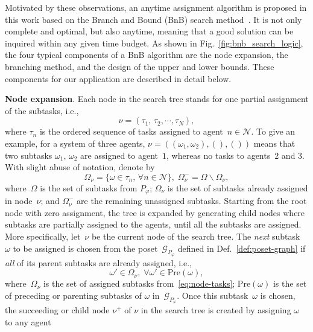 Motivated by these observations, an anytime assignment
algorithm is proposed in this work based on the Branch and Bound (BnB) search
method~\cite{lawler1966branch, morrison2016branch}.
It is not only complete and optimal, but also anytime, meaning that a good
solution can be inquired within any given time budget.
As shown in Fig.~\ref{fig:bnb_search_logic},
the four typical components of a BnB
algorithm are the node expansion, the branching method,
and the design of the upper and lower bounds.
These components for our application are described in detail below.

\textbf{Node expansion}.
Each node in the search tree stands for one partial assignment of the
subtasks, i.e.,
\begin{equation}\label{eq:node}
\nu = (\tau_1,\,\tau_2,\cdots,\tau_N),
\end{equation}
where $\tau_n$ is the ordered sequence of tasks assigned to agent~$n\in \mathcal{N}$.
To give an example, for a system of three agents,
$\nu=((\omega_1,\omega_2),(),())$ means that two subtasks
$\omega_1,\, \omega_2$ are assigned to agent~$1$,
whereas no tasks to agents~$2$ and $3$.
With slight abuse of notation, denote by
\begin{equation}\label{eq:node-tasks}
\Omega_{\nu}=\{\omega\in\tau_n,\,\forall n\in \mathcal{N}\},
\;\Omega^-_{\nu} = \Omega\backslash \Omega_{\nu},
\end{equation}
where~$\Omega$ is the set of subtasks from $P_\varphi$;
$\Omega_{\nu}$ is the set of subtasks already assigned in node~$\nu$;
and $\Omega^-_{\nu}$ are the remaining unassigned subtasks.
Starting from the root node with zero assignment, the tree is expanded by
generating child nodes where subtasks are partially assigned to the agents,
until all the subtasks are assigned.
More specifically,
let~$\nu$ be the current node of the search tree.
The \emph{next} subtask~$\omega$ to be assigned is chosen from the
poset~$\mathcal{G}_{P_\varphi}$ defined in Def.~\ref{def:poset-graph}
if \emph{all} of its parent subtasks are already assigned, i.e.,
\begin{equation}\label{eq:next-task}
\omega' \in \Omega_\nu, \; \forall \omega' \in \text{Pre}(\omega),
\end{equation}
where~$\Omega_\nu$ is the set of assigned  subtasks from~\eqref{eq:node-tasks};
$\text{Pre}(\omega)$ is the set of preceding or parenting subtasks of $\omega$ in~$\mathcal{G}_{P_\varphi}$.
Once this subtask~$\omega$ is chosen, the succeeding or child node $\nu^+$
of $\nu$ in the search tree is created by assigning $\omega$ to any agent
